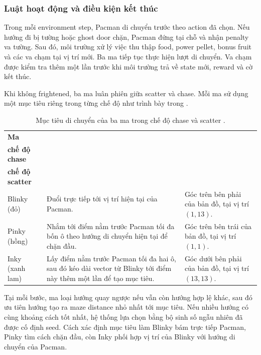 \subsubsection{Luật hoạt động và điều kiện kết thúc}

Trong mỗi environment step, Pacman di chuyển trước theo action đã chọn. Nếu hướng đi bị tường hoặc ghost door chặn, Pacman đứng tại chỗ và nhận penalty va tường. Sau đó, môi trường xử lý việc thu thập food, power pellet, bonus fruit và các va chạm tại vị trí mới. Ba ma tiếp tục thực hiện lượt di chuyển. Va chạm được kiểm tra thêm một lần trước khi môi trường trả về state mới, reward và cờ kết thúc.

Khi không frightened, ba ma luân phiên giữa scatter và chase. Mỗi ma sử dụng một mục tiêu riêng trong từng chế độ như trình bày trong .

\begin{table}[H]
    \centering
    \renewcommand{\arraystretch}{1.14}
    \small
    \begin{tabularx}{0.96\textwidth}{@{}
        >{\raggedright\arraybackslash}p{2.5cm}
        >{\raggedright\arraybackslash}X
        >{\raggedright\arraybackslash}p{4.5cm}
    @{}}
        \toprule
        \textbf{Ma} &
        \makecell{\textbf{Mục tiêu trong}\\\textbf{chế độ chase}} &
        \makecell{\textbf{Mục tiêu trong}\\\textbf{chế độ scatter}} \\
        \midrule
        Blinky (đỏ) &
        Đuổi trực tiếp tới vị trí hiện tại của Pacman. &
        Góc trên bên phải của bản đồ, tại vị trí $(1,13)$. \\
        Pinky (hồng) &
        Nhắm tới điểm nằm trước Pacman tối đa bốn ô theo hướng di chuyển hiện tại để chặn đầu. &
        Góc trên bên trái của bản đồ, tại vị trí $(1,1)$. \\
        Inky (xanh lam) &
        Lấy điểm nằm trước Pacman tối đa hai ô, sau đó kéo dài vector từ Blinky tới điểm này thêm một lần để tạo mục tiêu. &
        Góc dưới bên phải của bản đồ, tại vị trí $(13,13)$. \\
        \bottomrule
    \end{tabularx}
    \caption{Mục tiêu di chuyển của ba ma trong chế độ chase và scatter \cite{DRLPacmanGitHub}.}
    \label{tab:ghost-targets}
\end{table}

Tại mỗi bước, ma loại hướng quay ngược nếu vẫn còn hướng hợp lệ khác, sau đó ưu tiên hướng tạo ra maze distance nhỏ nhất tới mục tiêu. Nếu nhiều hướng có cùng khoảng cách tốt nhất, hệ thống lựa chọn bằng bộ sinh số ngẫu nhiên đã được cố định seed. Cách xác định mục tiêu làm Blinky bám trực tiếp Pacman, Pinky tìm cách chặn đầu, còn Inky phối hợp vị trí của Blinky với hướng di chuyển của Pacman.

